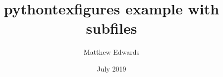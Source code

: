 \documentclass[12pt,a4paper]{article}
\begin{document}
	\title{pythontexfigures example with subfiles}
	\author{Matthew Edwards}
	\date{July 2019}
	\maketitle

    
    
\end{document}
